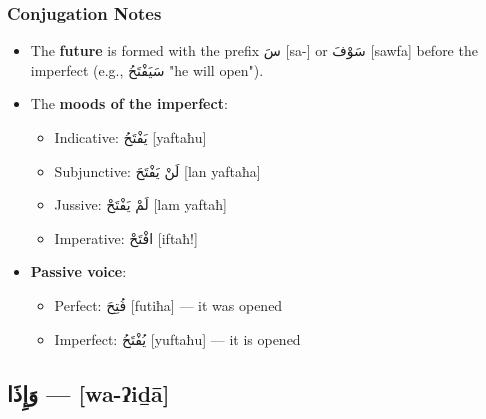 \documentclass[letterpaper,12pt]{article}
\begin{document}
\subsubsection*{Conjugation Notes}
\begin{itemize}
  \item The \textbf{future} is formed with the prefix \textarabic{سَ} [sa-] or \textarabic{سَوْفَ} [sawfa] before the imperfect (e.g., \textarabic{سَيَفْتَحُ} "he will open").
  \item The \textbf{moods of the imperfect}: 
    \begin{itemize}
      \item Indicative: \textarabic{يَفْتَحُ} [yaftaħu] 
      \item Subjunctive: \textarabic{لَنْ يَفْتَحَ} [lan yaftaħa]
      \item Jussive: \textarabic{لَمْ يَفْتَحْ} [lam yaftaħ]
      \item Imperative: \textarabic{افْتَحْ} [iftaħ!]
    \end{itemize}
  \item \textbf{Passive voice}: 
    \begin{itemize}
      \item Perfect: \textarabic{فُتِحَ} [futiħa] — it was opened
      \item Imperfect: \textarabic{يُفْتَحُ} [yuftaħu] — it is opened
    \end{itemize}
\end{itemize}

\subsection{\textarabic{وَإِذَا} — [wa-ʔiḏā]}
\end{document}

